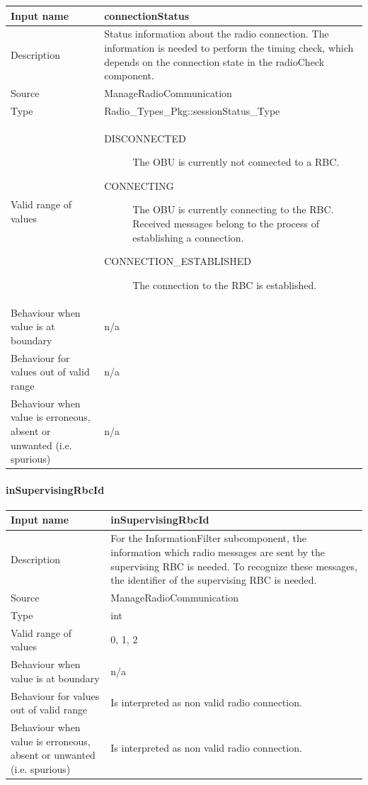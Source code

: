 \begin{longtable}{p{}p{}}
\toprule
Input name				& connectionStatus \\
\midrule
Description				& Status information about the radio connection. The information is needed to perform the timing check, which depends on the connection state in the radioCheck component. \\
\midrule
Source					& ManageRadioCommunication \\ 
\midrule
Type					& Radio\_Types\_Pkg::sessionStatus\_Type \\
\midrule
Valid range of values	& 
\begin{description}
\item[DISCONNECTED] The OBU is currently not connected to a RBC.
\item[CONNECTING] The OBU is currently connecting to the RBC. Received messages belong to the process of establishing a connection.
\item[CONNECTION\_ESTABLISHED] The connection to the RBC is established.
\end{description} \\
\midrule
Behaviour when value is at boundary	& n/a\\
\midrule
Behaviour for values out of valid range	& n/a\\
\midrule
Behaviour when value is erroneous, absent or unwanted (i.e. spurious) & n/a\\
\bottomrule
\end{longtable}


\paragraph{inSupervisingRbcId}

\begin{longtable}{p{}p{}}
\toprule
Input name				& inSupervisingRbcId \\
\midrule
Description				& For the InformationFilter subcomponent, the information which radio messages are sent by the supervising RBC is needed. To recognize these messages, the identifier of the supervising RBC is needed. \\
\midrule
Source					& ManageRadioCommunication\\ 
\midrule
Type					& int \\
\midrule
Valid range of values	& 0, 1, 2
 \\
\midrule
Behaviour when value is at boundary	& n/a\\
\midrule
Behaviour for values out of valid range	&  Is interpreted as non valid radio connection.\\
\midrule
Behaviour when value is erroneous, absent or unwanted (i.e. spurious) & Is interpreted as non valid radio connection.\\
\bottomrule
\end{longtable}


